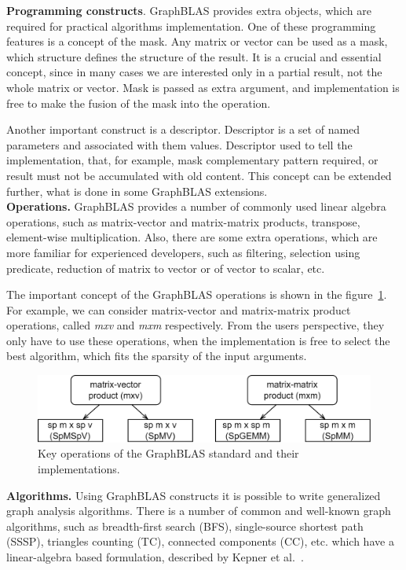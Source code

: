 \textbf{Programming constructs}. GraphBLAS provides extra objects, which are required for practical algorithms implementation. One of these programming features is a concept of the mask. Any matrix or vector can be used as a mask, which structure defines the structure of the result. It is a crucial and essential concept, since in many cases we are interested only in a partial result, not the whole matrix or vector. Mask is passed as extra argument, and implementation is free to make the fusion of the mask into the operation.

Another important construct is a descriptor. Descriptor is a set of named parameters and associated with them values. Descriptor used to tell the implementation, that, for example, mask complementary pattern required, or result must not be accumulated with old content. This concept can be extended further, what is done in some GraphBLAS extensions.\\

\textbf{Operations.} GraphBLAS provides a number of commonly used linear algebra operations, such as matrix-vector and matrix-matrix products, transpose, element-wise multiplication. Also, there are some extra operations, which are more familiar for experienced developers, such as filtering, selection using predicate, reduction of matrix to vector or of vector to scalar, etc.

The important concept of the GraphBLAS operations is shown in the figure~\ref{fig:gb_ops}. For example, we can consider matrix-vector and matrix-matrix product operations, called \textit{mxv} and \textit{mxm} respectively. From the users perspective, they only have to use these operations, when the implementation is free to select the best algorithm, which fits the sparsity of the input arguments.

\begin{figure}[h]
    \centering
    \includegraphics[width=1.0\textwidth]{images/types_of_operations.png}
    \caption{Key operations of the GraphBLAS standard and their implementations.}
    \label{fig:gb_ops}
\end{figure}

\textbf{Algorithms.} Using GraphBLAS constructs it is possible to write generalized graph analysis algorithms. There is a number of common and well-known graph algorithms, such as breadth-first search (BFS), single-source shortest path (SSSP), triangles counting (TC), connected components (CC), etc. which have a linear-algebra based formulation, described by Kepner et al.~\cite{misc:la_graph}.

